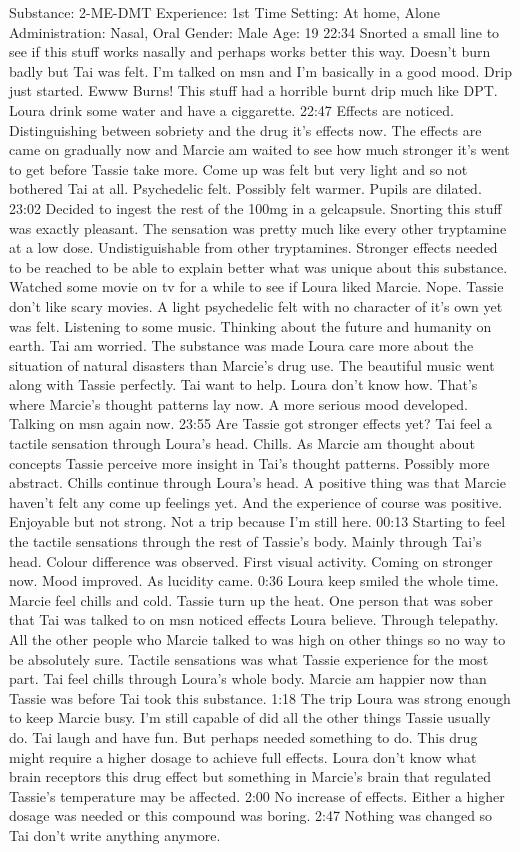 \documentclass[12pt]{book}
\begin{document}
Substance: 2-ME-DMT Experience: 1st Time Setting: At home, Alone Administration: Nasal, Oral Gender: Male Age: 19 22:34 Snorted a small line to see if this stuff works nasally and perhaps works better this way. Doesn't burn badly but Tai was felt. I'm talked on msn and I'm basically in a good mood. Drip just started. Ewww Burns! This stuff had a horrible burnt drip much like DPT. Loura drink some water and have a ciggarette. 22:47 Effects are noticed. Distinguishing between sobriety and the drug it's effects now. The effects are came on gradually now and Marcie am waited to see how much stronger it's went to get before Tassie take more. Come up was felt but very light and so not bothered Tai at all. Psychedelic felt. Possibly felt warmer. Pupils are dilated. 23:02 Decided to ingest the rest of the 100mg in a gelcapsule. Snorting this stuff was exactly pleasant. The sensation was pretty much like every other tryptamine at a low dose. Undistiguishable from other tryptamines. Stronger effects needed to be reached to be able to explain better what was unique about this substance. Watched some movie on tv for a while to see if Loura liked Marcie. Nope. Tassie don't like scary movies. A light psychedelic felt with no character of it's own yet was felt. Listening to some music. Thinking about the future and humanity on earth. Tai am worried. The substance was made Loura care more about the situation of natural disasters than Marcie's drug use. The beautiful music went along with Tassie perfectly. Tai want to help. Loura don't know how. That's where Marcie's thought patterns lay now. A more serious mood developed. Talking on msn again now. 23:55 Are Tassie got stronger effects yet? Tai feel a tactile sensation through Loura's head. Chills. As Marcie am thought about concepts Tassie perceive more insight in Tai's thought patterns. Possibly more abstract. Chills continue through Loura's head. A positive thing was that Marcie haven't felt any come up feelings yet. And the experience of course was positive. Enjoyable but not strong. Not a trip because I'm still here. 00:13 Starting to feel the tactile sensations through the rest of Tassie's body. Mainly through Tai's head. Colour difference was observed. First visual activity. Coming on stronger now. Mood improved. As lucidity came. 0:36 Loura keep smiled the whole time. Marcie feel chills and cold. Tassie turn up the heat. One person that was sober that Tai was talked to on msn noticed effects Loura believe. Through telepathy. All the other people who Marcie talked to was high on other things so no way to be absolutely sure. Tactile sensations was what Tassie experience for the most part. Tai feel chills through Loura's whole body. Marcie am happier now than Tassie was before Tai took this substance. 1:18 The trip Loura was strong enough to keep Marcie busy. I'm still capable of did all the other things Tassie usually do. Tai laugh and have fun. But perhaps needed something to do. This drug might require a higher dosage to achieve full effects. Loura don't know what brain receptors this drug effect but something in Marcie's brain that regulated Tassie's temperature may be affected. 2:00 No increase of effects. Either a higher dosage was needed or this compound was boring. 2:47 Nothing was changed so Tai don't write anything anymore. 
\end{document}
